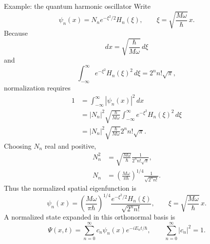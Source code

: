 \documentclass[11pt]{beamer}
\begin{document}
\begin{frame}[allowframebreaks]{Example: the quantum harmonic oscillator}
Write
\[
  \psi_n(x)=N_n e^{-\xi^2/2}H_n(\xi),
  \qquad
  \xi=\sqrt{\frac{M\omega}{\hbar}}\,x.
\]
Because
\[
  dx=\sqrt{\frac{\hbar}{M\omega}}\,d\xi
\]
and
\[
  \int_{-\infty}^{\infty}
    e^{-\xi^2}H_n(\xi)^2\,d\xi
    =2^n n!\sqrt{\pi},
\]
normalization requires
\begin{align*}
  1
   &=\int_{-\infty}^{\infty}|\psi_n(x)|^2\,dx\\
   &=|N_n|^2
     \sqrt{\frac{\hbar}{M\omega}}
     \int_{-\infty}^{\infty}
       e^{-\xi^2}H_n(\xi)^2\,d\xi\\
   &=|N_n|^2
     \sqrt{\frac{\hbar}{M\omega}}
     2^n n!\sqrt{\pi}.
\end{align*}
Choosing $N_n$ real and positive,
\begin{align*}
  N_n^2
   &=
    \sqrt{\frac{M\omega}{\hbar}}
    \frac{1}{2^n n!\sqrt{\pi}},\\
  N_n
   &=
    \left(\frac{M\omega}{\pi\hbar}\right)^{1/4}
    \frac{1}{\sqrt{2^n n!}}.
\end{align*}
Thus the normalized spatial eigenfunction is
\begin{equation}
  \psi_n(x)
    =
  \left(\frac{M\omega}{\pi\hbar}\right)^{1/4}
  \frac{e^{-\xi^2/2}H_n(\xi)}{\sqrt{2^n n!}},
  \qquad
  \xi=\sqrt{\frac{M\omega}{\hbar}}\,x.
  \label{eq:qho-normalized-eigenfunction}
\end{equation}
A normalized state expanded in this orthonormal basis is
\begin{equation}
  \Psi(x,t)
    =\sum_{n=0}^{\infty}
      c_n\psi_n(x)e^{-iE_nt/\hbar},
  \qquad
  \sum_{n=0}^{\infty}|c_n|^2=1.
  \label{eq:qho-solution}
\end{equation}
\end{frame}
\end{document}
